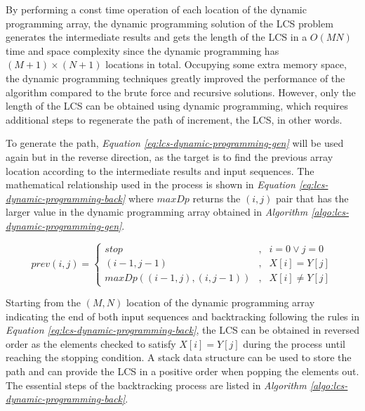 \documentclass[sigplan,screen]{acmart}
\begin{document}
By performing a const time operation of each location of the dynamic programming array, the dynamic programming solution of the LCS problem generates the intermediate results and gets the length of the LCS in a $O(MN)$ time and space complexity since the dynamic programming has $(M+1)\times(N+1)$ locations in total. \cite{bergrothSurveyLongestCommon2000, hirschbergAlgorithmsLongestCommon1977, hirschbergLinearSpaceAlgorithm1975, patersonLongestCommonSubsequences1994} Occupying some extra memory space, the dynamic programming techniques greatly improved the performance of the algorithm compared to the brute force and recursive solutions. However, only the length of the LCS can be obtained using dynamic programming, which requires additional steps to regenerate the path of increment, the LCS, in other words. \cite{bergrothSurveyLongestCommon2000}

To generate the path, \textit{Equation \ref{eq:lcs-dynamic-programming-gen}} will be used again but in the reverse direction, as the target is to find the previous array location according to the intermediate results and input sequences. The mathematical relationship used in the process is shown in \textit{Equation \ref{eq:lcs-dynamic-programming-back}} where $maxDp$ returns the $(i, j)$ pair that has the larger value in the dynamic programming array obtained in \textit{Algorithm \ref{algo:lcs-dynamic-programming-gen}}.

\begin{equation}
    \label{eq:lcs-dynamic-programming-back}
    prev(i, j) = \left \{
    \begin{aligned}
        stop &, & i = 0 \vee j = 0 \\
        (i-1, j-1) &, & X[i] = Y[j] \\
        maxDp((i-1, j), (i, j-1)) &, & X[i] \neq Y[j]
    \end{aligned}
    \right.
\end{equation}

Starting from the $(M, N)$ location of the dynamic programming array indicating the end of both input sequences and backtracking following the rules in \textit{Equation \ref{eq:lcs-dynamic-programming-back}}, the LCS can be obtained in reversed order as the elements checked to satisfy $X[i]=Y[j]$ during the process until reaching the stopping condition. A stack data structure can be used to store the path and can provide the LCS in a positive order when popping the elements out. The essential steps of the backtracking process are listed in \textit{Algorithm \ref{algo:lcs-dynamic-programming-back}}.
\end{document}

